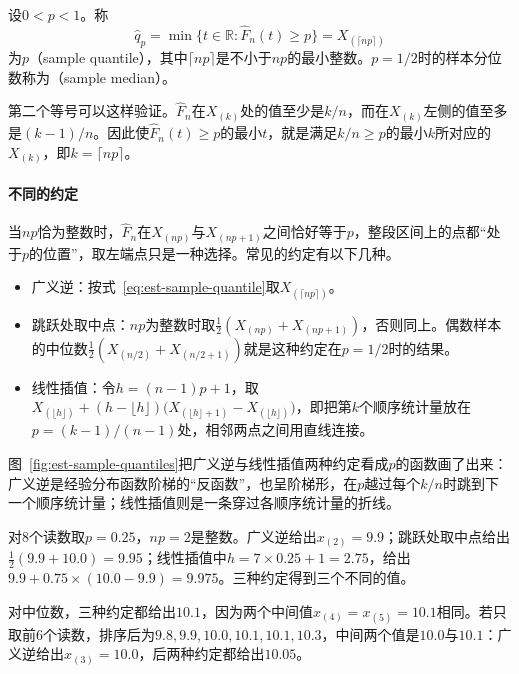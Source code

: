 \begin{definition}[样本分位数]
\label{def:est-sample-quantile}
设$0<p<1$。称
\begin{equation}
\label{eq:est-sample-quantile}
\hat q_p=\min\{t\in\mathbb{R}:\hat F_n(t)\ge p\}=X_{(\lceil np\rceil)}
\end{equation}
为$p$（sample quantile），其中$\lceil np\rceil$是不小于$np$的最小整数。$p=1/2$时的样本分位数称为（sample median）。
\end{definition}

第二个等号可以这样验证。$\hat F_n$在$X_{(k)}$处的值至少是$k/n$，而在$X_{(k)}$左侧的值至多是$(k-1)/n$。因此使$\hat F_n(t)\ge p$的最小$t$，就是满足$k/n\ge p$的最小$k$所对应的$X_{(k)}$，即$k=\lceil np\rceil$。

\paragraph{不同的约定}
当$np$恰为整数时，$\hat F_n$在$X_{(np)}$与$X_{(np+1)}$之间恰好等于$p$，整段区间上的点都“处于$p$的位置”，取左端点只是一种选择。常见的约定有以下几种。
\begin{itemize}
  \item 广义逆：按式~\eqref{eq:est-sample-quantile}取$X_{(\lceil np\rceil)}$。
  \item 跳跃处取中点：$np$为整数时取$\frac12(X_{(np)}+X_{(np+1)})$，否则同上。偶数样本的中位数$\frac12(X_{(n/2)}+X_{(n/2+1)})$就是这种约定在$p=1/2$时的结果。
  \item 线性插值：令$h=(n-1)p+1$，取$X_{(\lfloor h\rfloor)}+(h-\lfloor h\rfloor)\big(X_{(\lfloor h\rfloor+1)}-X_{(\lfloor h\rfloor)}\big)$，即把第$k$个顺序统计量放在$p=(k-1)/(n-1)$处，相邻两点之间用直线连接。
\end{itemize}
图~\ref{fig:est-sample-quantiles}把广义逆与线性插值两种约定看成$p$的函数画了出来：广义逆是经验分布函数阶梯的“反函数”，也呈阶梯形，在$p$越过每个$k/n$时跳到下一个顺序统计量；线性插值则是一条穿过各顺序统计量的折线。

\begin{example}[读数的四分位数与中位数]
\label{ex:est-quantile-conventions}
对$8$个读数取$p=0.25$，$np=2$是整数。广义逆给出$x_{(2)}=9.9$；跳跃处取中点给出$\frac12(9.9+10.0)=9.95$；线性插值中$h=7\times0.25+1=2.75$，给出$9.9+0.75\times(10.0-9.9)=9.975$。三种约定得到三个不同的值。

对中位数，三种约定都给出$10.1$，因为两个中间值$x_{(4)}=x_{(5)}=10.1$相同。若只取前$6$个读数，排序后为$9.8,9.9,10.0,10.1,10.1,10.3$，中间两个值是$10.0$与$10.1$：广义逆给出$x_{(3)}=10.0$，后两种约定都给出$10.05$。
\end{example}

